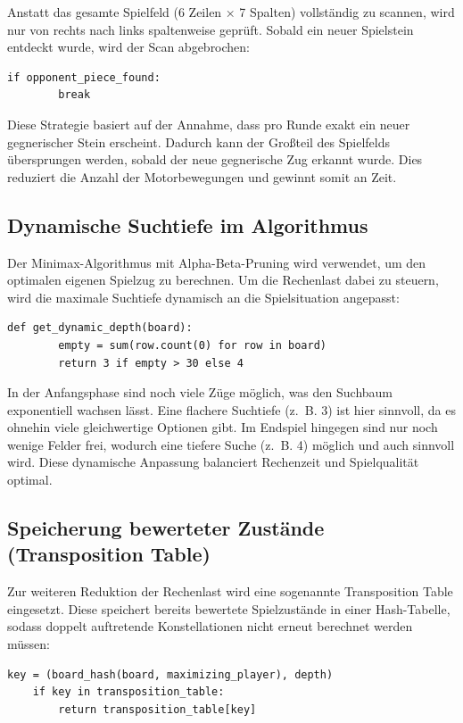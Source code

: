 Anstatt das gesamte Spielfeld (6 Zeilen × 7 Spalten) vollständig zu scannen, wird nur von rechts nach links spaltenweise geprüft. Sobald ein neuer Spielstein entdeckt wurde, wird der Scan abgebrochen:

\begin{lstlisting}[style=pythonstyle]
	if opponent_piece_found:
		break
\end{lstlisting}

Diese Strategie basiert auf der Annahme, dass pro Runde exakt ein neuer gegnerischer Stein erscheint. Dadurch kann der Großteil des Spielfelds übersprungen werden, sobald der neue gegnerische Zug erkannt wurde. Dies reduziert die Anzahl der Motorbewegungen und gewinnt somit an Zeit.

\subsection{Dynamische Suchtiefe im Algorithmus}

Der Minimax-Algorithmus mit Alpha-Beta-Pruning wird verwendet, um den optimalen eigenen Spielzug zu berechnen. Um die Rechenlast dabei zu steuern, wird die maximale Suchtiefe dynamisch an die Spielsituation angepasst:

\begin{lstlisting}[style=pythonstyle]
	def get_dynamic_depth(board):
		empty = sum(row.count(0) for row in board)
		return 3 if empty > 30 else 4
\end{lstlisting}

In der Anfangsphase sind noch viele Züge möglich, was den Suchbaum exponentiell wachsen lässt. Eine flachere Suchtiefe (z.~B. 3) ist hier sinnvoll, da es ohnehin viele gleichwertige Optionen gibt. Im Endspiel hingegen sind nur noch wenige Felder frei, wodurch eine tiefere Suche (z.~B. 4) möglich und auch sinnvoll wird. Diese dynamische Anpassung balanciert Rechenzeit und Spielqualität optimal.

\subsection{Speicherung bewerteter Zustände (Transposition Table)}

Zur weiteren Reduktion der Rechenlast wird eine sogenannte Transposition Table eingesetzt. Diese speichert bereits bewertete Spielzustände in einer Hash-Tabelle, sodass doppelt auftretende Konstellationen nicht erneut berechnet werden müssen:

\begin{lstlisting}[style=pythonstyle]
	key = (board_hash(board, maximizing_player), depth)
	if key in transposition_table:
		return transposition_table[key]
\end{lstlisting}


